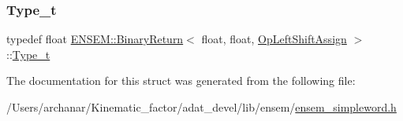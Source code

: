 \mbox{\label{structENSEM_1_1BinaryReturn_3_01float_00_01float_00_01OpLeftShiftAssign_01_4_a5a606c4c7a70df274b8a186efebfd11e}} 
\subsubsection{\texorpdfstring{Type\_t}{Type\_t}\hspace{0.1cm}{\footnotesize\ttfamily [2/2]}}
{\footnotesize\ttfamily typedef float \mbox{\hyperlink{structENSEM_1_1BinaryReturn}{E\+N\+S\+E\+M\+::\+Binary\+Return}}$<$ float, float, \mbox{\hyperlink{structENSEM_1_1OpLeftShiftAssign}{Op\+Left\+Shift\+Assign}} $>$\+::\mbox{\hyperlink{structENSEM_1_1BinaryReturn_3_01float_00_01float_00_01OpLeftShiftAssign_01_4_a5a606c4c7a70df274b8a186efebfd11e}{Type\+\_\+t}}}



The documentation for this struct was generated from the following file\+:\begin{DoxyCompactItemize}
\item 
/\+Users/archanar/\+Kinematic\+\_\+factor/adat\+\_\+devel/lib/ensem/\mbox{\hyperlink{lib_2ensem_2ensem__simpleword_8h}{ensem\+\_\+simpleword.\+h}}\end{DoxyCompactItemize}

